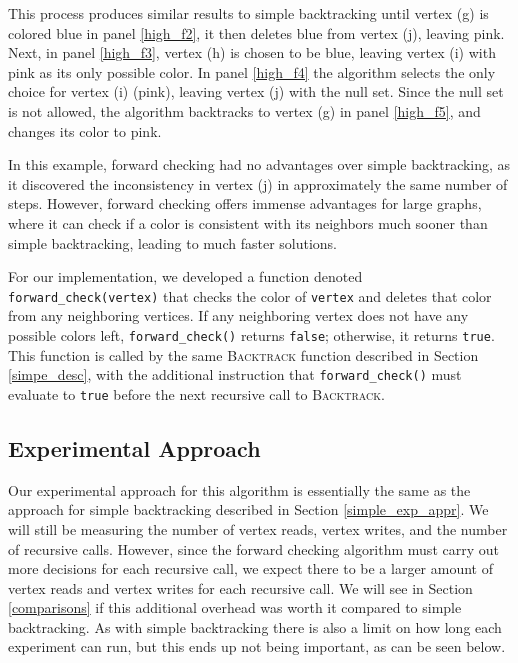 \documentclass{article}
\begin{document}
		This process produces similar results to simple backtracking until vertex (g) is colored blue in panel \ref{high_f2}, it then deletes blue from vertex (j), leaving pink. Next, in panel \ref{high_f3}, vertex (h) is chosen to be blue, leaving vertex (i) with pink as its only possible color. In panel \ref{high_f4} the algorithm selects the only choice for vertex (i) (pink), leaving vertex (j) with the null set. Since the null set is not allowed, the algorithm backtracks to vertex (g) in panel \ref{high_f5}, and changes its color to pink.
		
		In this example, forward checking had no advantages over simple backtracking, as it discovered the inconsistency in vertex (j) in approximately the same number of steps. However, forward checking offers immense advantages for large graphs, where it can check if a color is consistent with its neighbors much sooner than simple backtracking, leading to much faster solutions.
		
		For our implementation, we developed a function denoted \texttt{forward\_check(vertex)} that checks the color of \texttt{vertex} and deletes that color from any neighboring vertices. If any neighboring vertex does not have any possible colors left, \texttt{forward\_check()} returns \texttt{false}; otherwise, it returns \texttt{true}. This function is called by the same \textsc{Backtrack} function described in Section \ref{simpe_desc}, with the additional instruction that \texttt{forward\_check()} must evaluate to \texttt{true} before the next recursive call to \textsc{Backtrack}.
		

	\subsection{Experimental Approach}
	
		Our experimental approach for this algorithm is essentially the same as the approach for simple backtracking described in Section \ref{simple_exp_appr}. We will still be measuring the number of vertex reads, vertex writes, and the number of recursive calls. However, since the forward checking algorithm must carry out more decisions for each recursive call, we expect there to be a larger amount of vertex reads and vertex writes for each recursive call. We will see in Section \ref{comparisons} if this additional overhead was worth it compared to simple backtracking. As with simple backtracking there is also a limit on how long each experiment can run, but this ends up not being important, as can be seen below.
	
\end{document}
